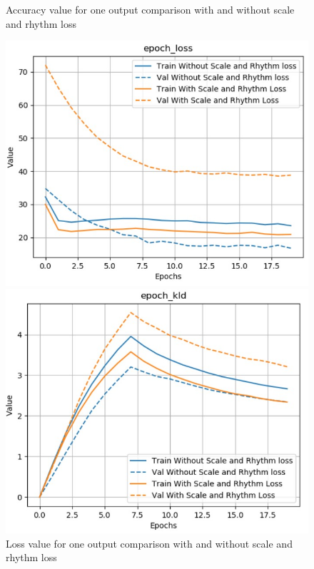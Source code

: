 \documentclass[12pt]{report}
\begin{document}
\begin{figure}[htbp]
\begin{minipage}{0.5 \textwidth}
\begin{center}
            \caption{Accuracy value for one output comparison with and without scale and rhythm loss}
            \label{fig:exp:scale-rhythm:acc-output-comparison}
        \end{center}
    \end{minipage}
\end{figure}

\begin{figure}[htbp]
    \begin{minipage}{0.5\textwidth}
        \begin{center}
            \includegraphics[width=\textwidth]{images/experiences/scale-rhythm-rnn/loss-comparison-scale-rhythm.jpg}
            \caption{Loss value for one output comparison with and without scale and rhythm loss}
            \label{fig:exp:scale-rhythm:loss-comparison}
        \end{center}
    \end{minipage} \hfill
    \begin{minipage}{0.5 \textwidth}
        \begin{center}
            \includegraphics[width=\textwidth]{images/experiences/scale-rhythm-rnn/kld-comparison-scale-rhythm.jpg}

\end{center}
\end{minipage}
\end{figure}
\end{document}
